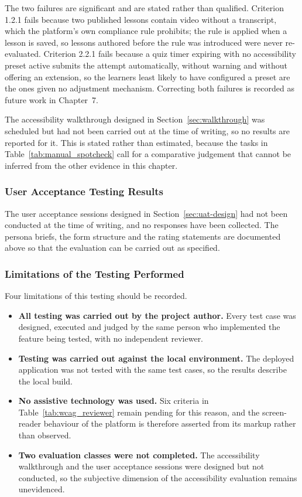 \documentclass[12pt, oneside]{article} %
\begin{document}
The two failures are significant and are stated rather than qualified. Criterion 1.2.1 fails because two published lessons contain video without a transcript, which the platform's own compliance rule prohibits; the rule is applied when a lesson is saved, so lessons authored before the rule was introduced were never re-evaluated. Criterion 2.2.1 fails because a quiz timer expiring with no accessibility preset active submits the attempt automatically, without warning and without offering an extension, so the learners least likely to have configured a preset are the ones given no adjustment mechanism. Correcting both failures is recorded as future work in Chapter~7.

The accessibility walkthrough designed in Section~\ref{sec:walkthrough} was scheduled but had not been carried out at the time of writing, so no results are reported for it. This is stated rather than estimated, because the tasks in Table~\ref{tab:manual_spotcheck} call for a comparative judgement that cannot be inferred from the other evidence in this chapter.

\subsubsection{User Acceptance Testing Results}

The user acceptance sessions designed in Section~\ref{sec:uat-design} had not been conducted at the time of writing, and no responses have been collected. The persona briefs, the form structure and the rating statements are documented above so that the evaluation can be carried out as specified.

\subsubsection{Limitations of the Testing Performed}
\label{sec:test-limits}

Four limitations of this testing should be recorded.

\begin{itemize}
    \item \textbf{All testing was carried out by the project author.} Every test case was designed, executed and judged by the same person who implemented the feature being tested, with no independent reviewer.
    \item \textbf{Testing was carried out against the local environment.} The deployed application was not tested with the same test cases, so the results describe the local build.
    \item \textbf{No assistive technology was used.} Six criteria in Table~\ref{tab:wcag_reviewer} remain pending for this reason, and the screen-reader behaviour of the platform is therefore asserted from its markup rather than observed.
    \item \textbf{Two evaluation classes were not completed.} The accessibility walkthrough and the user acceptance sessions were designed but not conducted, so the subjective dimension of the accessibility evaluation remains unevidenced.
\end{itemize}
\end{document}

